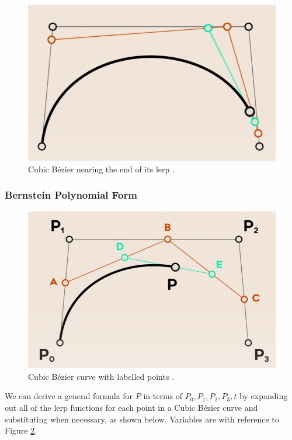 \documentclass[letterpaper, 12pt]{article}
\begin{document}
\begin{figure}[H]
    \centering
    \includegraphics[width=.8\textwidth]{cubic_ill_end.png}
    \caption{Cubic Bézier nearing the end of its lerp \protect\cite{holmerBeautyBezierCurves2021}.}
    \label{fig:cubic_ill_end}
\end{figure}

\subsubsection{Bernstein Polynomial Form}

\begin{figure}[H]
    \centering
    \includegraphics[width=.8\textwidth]{labelled_cubic.png}
    \caption{Cubic Bézier curve with labelled points \protect\cite{holmerBeautyBezierCurves2021}.}
    \label{fig:labelled_cubic}
\end{figure}

We can derive a general formula for \(P\) in terms of \(P_0, P_1, P_2, P_3, t\) by expanding out
all of the lerp functions for each point in a Cubic Bézier curve
and substituting when necessary, as shown below. Variables are
with reference to Figure \ref*{fig:labelled_cubic}.
\end{document}
